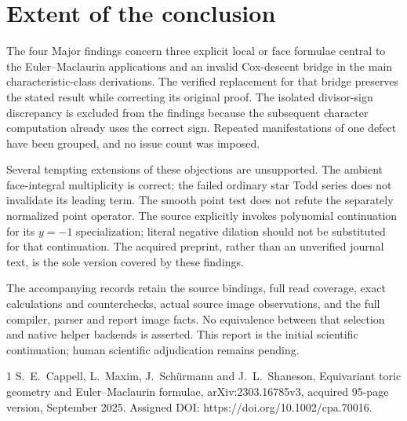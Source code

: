 \documentclass[10pt]{article}
\begin{document}
\section*{Extent of the conclusion}
The four Major findings concern three explicit local or face formulae central to the Euler–Maclaurin applications and an invalid Cox-descent bridge in the main characteristic-class derivations. The verified replacement for that bridge preserves the stated result while correcting its original proof. The isolated divisor-sign discrepancy is excluded from the findings because the subsequent character computation already uses the correct sign. Repeated manifestations of one defect have been grouped, and no issue count was imposed.\par
Several tempting extensions of these objections are unsupported. The ambient face-integral multiplicity is correct; the failed ordinary star Todd series does not invalidate its leading term. The smooth point test does not refute the separately normalized point operator. The source explicitly invokes polynomial continuation for its \(y=-1\) specialization; literal negative dilation should not be substituted for that continuation. The acquired preprint, rather than an unverified journal text, is the sole version covered by these findings.\par
The accompanying records retain the source bindings, full read coverage, exact calculations and counterchecks, actual source image observations, and the full compiler, parser and report image facts. No equivalence between that selection and native helper backends is asserted. This report is the initial scientific continuation; human scientific adjudication remains pending.\par
1 S. E. Cappell, L. Maxim, J. Schürmann and J. L. Shaneson, Equivariant toric geometry and Euler–Maclaurin formulae, arXiv:2303.16785v3, acquired 95-page version, September 2025. Assigned DOI: https://doi.org/10.1002/cpa.70016.\par
\end{document}
